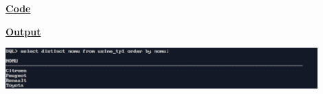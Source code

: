 \newpage
{}

\textbf{\underline{Code}}


\vspace{1cm}
\textbf{\underline{Output}}
\vspace{1cm}
\begin{center}
    \includegraphics[width=0.9\textwidth]{Questions/q12/q12.png}
\end{center}


